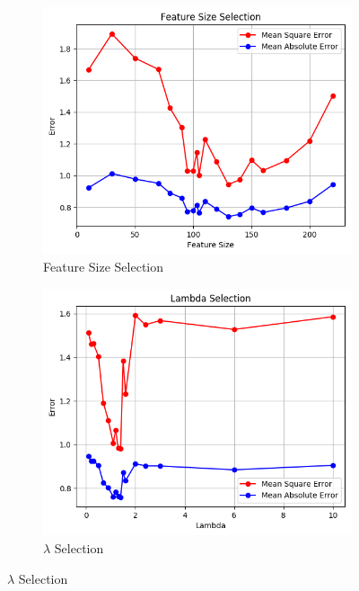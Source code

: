 \documentclass[10pt]{article}
\begin{document}
\begin{figure}[b]
    \centering
    \begin{subfigure}{0.33\textwidth}
      \centering
      \includegraphics[width=1\textwidth]{Feature_Size_Selection}
      \caption{Feature Size Selection}
      \label{fig:Feature}
    \end{subfigure}%
    \begin{subfigure}{0.33\textwidth}
      \centering
      \includegraphics[width=1\textwidth]{Lambda_Selection}
      \caption{$\lambda$ Selection}
      \label{fig:Lamb}
    \end{subfigure}%

\end{figure}
\end{document}
